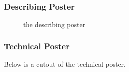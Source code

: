 \pagebreak

\subsubsection{Describing Poster}

\begin{figure}[!hbtp]
  \centering
  \caption{the describing poster}
  \label{fig:poster_describing}
\end{figure}

\pagebreak

\subsubsection{Technical Poster}

Below is a cutout of the technical poster.

